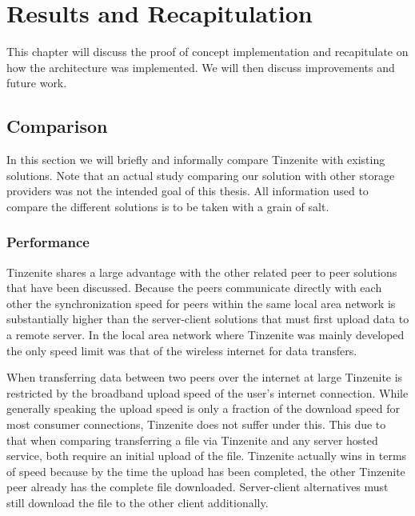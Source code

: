 \chapter{Results and Recapitulation}
\label{chap:Results and Recapitulation}

This chapter will discuss the proof of concept implementation and recapitulate on how the architecture was implemented.
We will then discuss improvements and future work.

\section{Comparison}

In this section we will briefly and informally compare Tinzenite with existing solutions.
Note that an actual study comparing our solution with other storage providers was not the intended goal of this thesis.
All information used to compare the different solutions is to be taken with a grain of salt.

\subsection{Performance}
\label{sub:Performance}

Tinzenite shares a large advantage with the other related peer to peer solutions that have been discussed.
Because the peers communicate directly with each other the synchronization speed for peers within the same local area network is substantially higher than the server-client solutions that must first upload data to a remote server.
In the local area network where Tinzenite was mainly developed the only speed limit was that of the wireless internet for data transfers.

When transferring data between two peers over the internet at large Tinzenite is restricted by the broadband upload speed of the user's internet connection.
While generally speaking the upload speed is only a fraction of the download speed for most consumer connections, Tinzenite does not suffer under this.
This due to that when comparing transferring a file via Tinzenite and any server hosted service, both require an initial upload of the file.
Tinzenite actually wins in terms of speed because by the time the upload has been completed, the other Tinzenite peer already has the complete file downloaded.
Server-client alternatives must still download the file to the other client additionally.

%

